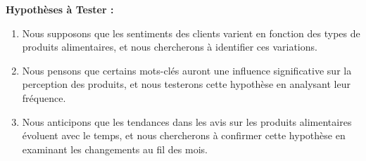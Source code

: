 \textbf{Hypothèses à Tester :}

\begin{enumerate}
    \item Nous supposons que les sentiments des clients varient en fonction des types de produits alimentaires, et nous chercherons à identifier ces variations.
    
    \item Nous pensons que certains mots-clés auront une influence significative sur la perception des produits, et nous testerons cette hypothèse en analysant leur fréquence.
    
    \item Nous anticipons que les tendances dans les avis sur les produits alimentaires évoluent avec le temps, et nous chercherons à confirmer cette hypothèse en examinant les changements au fil des mois.
\end{enumerate}